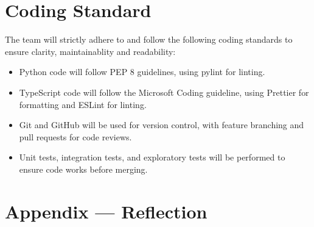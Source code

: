\documentclass{article}
\begin{document}
\section{Coding Standard}

The team will strictly adhere to and follow the following coding standards to ensure clarity, maintainablity and readability:
\begin{itemize}
  \item Python code will follow PEP 8 guidelines, using pylint for linting.
  \item TypeScript code will follow the Microsoft Coding guideline, using Prettier for formatting and ESLint for linting.
  \item Git and GitHub will be used for version control, with feature branching and pull requests for code reviews.
  \item Unit tests, integration tests, and exploratory tests will be performed to ensure code works before merging.
\end{itemize}

\newpage{}

\section*{Appendix --- Reflection}
\end{document}
